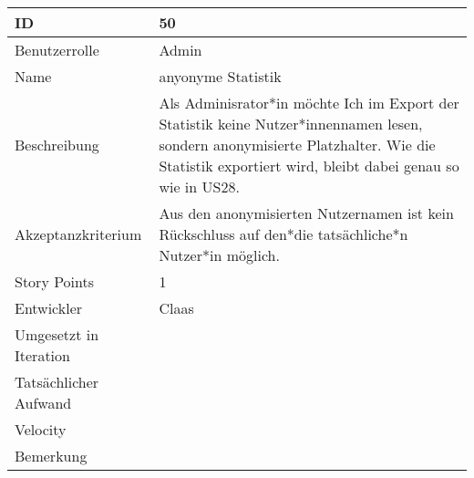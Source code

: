 \begin{tabularx}{\textwidth}{|p{}|X|}
	\hline
	ID & 50\\
	\hline
	Benutzerrolle & Admin\\
	\hline
	Name & anyonyme Statistik\\
	\hline
	Beschreibung & Als Adminisrator*in möchte Ich im Export der Statistik keine Nutzer*innennamen lesen, sondern anonymisierte Platzhalter. Wie die Statistik exportiert wird, bleibt dabei genau so wie in US28.\\
	\hline
	Akzeptanzkriterium & Aus den anonymisierten Nutzernamen ist kein Rückschluss auf den*die tatsächliche*n Nutzer*in möglich.\\
	\hline
	Story Points & 1\\
	\hline
	Entwickler & Claas\\
	\hline
	Umgesetzt in Iteration & \\
	\hline
	Tatsächlicher Aufwand & \\
	\hline
	Velocity & \\
	\hline
	Bemerkung & \\
	\hline
\end{tabularx}
\vspace{20pt}
